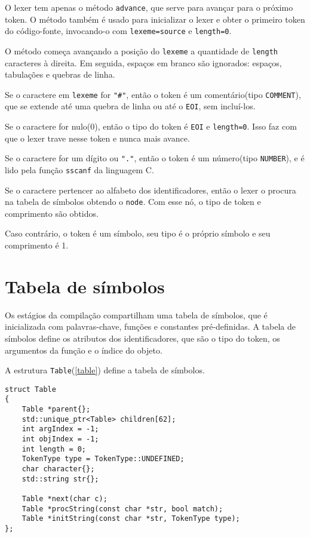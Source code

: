 O lexer tem apenas o método \texttt{advance}, que serve para avançar
para o próximo token. O método também é usado para inicializar o
lexer e obter o primeiro token do código-fonte,
invocando-o com \texttt{lexeme=source} e \texttt{length=0}.

O método começa avançando a posição do \texttt{lexeme} a quantidade de
\texttt{length} caracteres à direita.
Em seguida, espaços em branco são ignorados: espaços, tabulações e quebras de linha.

Se o caractere em \texttt{lexeme} for \texttt{"\#"}, então o token é um
comentário(tipo \texttt{COMMENT}),
que se extende até uma quebra de linha ou até o \texttt{EOI}, sem incluí-los.

Se o caractere for nulo(0), então o tipo do token é \texttt{EOI} e \texttt{length=0}.
Isso faz com que o lexer trave nesse token e nunca mais avance.

Se o caractere for um dígito ou \texttt{"."}, então o token é um número(tipo \texttt{NUMBER}),
e é lido pela função \texttt{sscanf} da linguagem C.

Se o caractere pertencer ao alfabeto dos identificadores,
então o lexer o procura na tabela de símbolos obtendo o \texttt{node}.
Com esse nó, o tipo de token e comprimento são obtidos.

Caso contrário, o token é um símbolo, seu tipo é o próprio símbolo
e seu comprimento é 1.

\section{Tabela de símbolos}
Os estágios da compilação compartilham uma tabela de símbolos,
que é inicializada com palavras-chave,
funções e constantes pré-definidas.
A tabela de símbolos define os atributos dos identificadores,
que são o tipo do token, os argumentos da função e o índice do objeto.

A estrutura \texttt{Table}(\ref{table}) define a tabela de símbolos.

\begin{lstlisting}[caption=Tabela de símbolos, label=table]
struct Table
{
    Table *parent{};
    std::unique_ptr<Table> children[62];
    int argIndex = -1;
    int objIndex = -1;
    int length = 0;
    TokenType type = TokenType::UNDEFINED;
    char character{};
    std::string str{};

    Table *next(char c);
    Table *procString(const char *str, bool match);
    Table *initString(const char *str, TokenType type);
};
\end{lstlisting}

